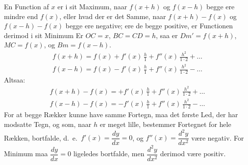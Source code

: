 \documentclass[12pt]{book}
\begin{document}
\begin{center}
\end{center}

En Function af $x$ er i sit Maximum, naar $f(x + h)$ og $f(x - h)$ begge ere mindre
end $f(x)$, eller hvad der er det Samme, naar $f(x + h) - f(x)$ og $f(x - h) - f(x)$
begge ere negative; ere de begge positive, er Functionen derimod i sit Minimum Er
$OC = x$, $BC = CD = h$, saa er $Dm' = f(x+h)$, $MC = f(x)$, og $Bm = f(x - h)$.
\begin{gather*}
f(x + h) = f(x) + f'(x)\,\frac{h}{1} + f''(x)\,\frac{h^{2}}{1\cdot2} + \dots\\
f(x - h) = f(x) - f'(x)\,\frac{h}{1} + f''(x)\,\frac{h^{2}}{1\cdot2} - \dots
\end{gather*}
Altsaa:
\begin{gather*}
f(x+h) - f(x) = +f'(x)\,\frac{h}{1} + f''(x)\,\frac{h^{2}}{1\cdot2} + \dots\\
f(x-h) - f(x) = -f'(x)\,\frac{h}{1} + f''(x)\,\frac{h^{2}}{1\cdot2} - \dots
\end{gather*}
For at begge Rækker kunne have samme Fortegn, maa det første Led, der har modsatte
Tegn, og som, naar $h$ er meget lille, bestemmer Fortegnet for hele Rækken,
bortfalde, d.\ e.\ $f'(x) = \dfrac{dy}{dx} = 0$, og
$f''(x) = \dfrac{d^{2}y}{dx^{2}}$ være negativ. For Minimum maa $\dfrac{dy}{dx} = 0$
ligeledes bortfalde, men $\dfrac{d^{2}y}{dx^{2}}$ derimod være positiv.
\end{document}
